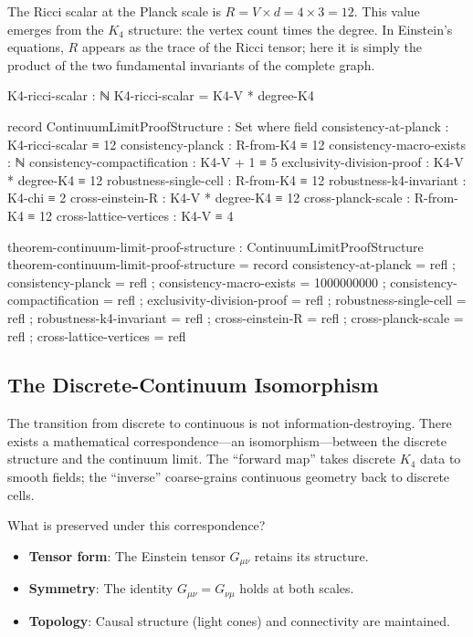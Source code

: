 \documentclass[11pt,a4paper]{book}
\begin{document}
The Ricci scalar at the Planck scale is $R = V \times d = 4 \times 3 = 12$. This value 
emerges from the $K_4$ structure: the vertex count times the degree. In Einstein's equations,
$R$ appears as the trace of the Ricci tensor; here it is simply the product of the two fundamental
invariants of the complete graph.

\begin{code}
K4-ricci-scalar : ℕ
K4-ricci-scalar = K4-V * degree-K4

record ContinuumLimitProofStructure : Set where
  field
    consistency-at-planck : K4-ricci-scalar ≡ 12
    consistency-planck : R-from-K4 ≡ 12
    consistency-macro-exists : ℕ
    consistency-compactification : K4-V + 1 ≡ 5
    exclusivity-division-proof : K4-V * degree-K4 ≡ 12
    robustness-single-cell : R-from-K4 ≡ 12
    robustness-k4-invariant : K4-chi ≡ 2
    cross-einstein-R : K4-V * degree-K4 ≡ 12
    cross-planck-scale : R-from-K4 ≡ 12
    cross-lattice-vertices : K4-V ≡ 4

theorem-continuum-limit-proof-structure : ContinuumLimitProofStructure
theorem-continuum-limit-proof-structure = record
  { consistency-at-planck = refl
  ; consistency-planck = refl
  ; consistency-macro-exists = 1000000000
  ; consistency-compactification = refl
  ; exclusivity-division-proof = refl
  ; robustness-single-cell = refl
  ; robustness-k4-invariant = refl
  ; cross-einstein-R = refl
  ; cross-planck-scale = refl
  ; cross-lattice-vertices = refl
  }
\end{code}

\subsection{The Discrete-Continuum Isomorphism}

The transition from discrete to continuous is not information-destroying. There exists a 
mathematical correspondence---an isomorphism---between the discrete structure and the continuum 
limit. The ``forward map'' takes discrete $K_4$ data to smooth fields; the ``inverse'' coarse-grains 
continuous geometry back to discrete cells.

What is preserved under this correspondence?
\begin{itemize}
\item \textbf{Tensor form}: The Einstein tensor $G_{\mu\nu}$ retains its structure.
\item \textbf{Symmetry}: The identity $G_{\mu\nu} = G_{\nu\mu}$ holds at both scales.
\item \textbf{Topology}: Causal structure (light cones) and connectivity are maintained.
\end{itemize}
\end{document}
